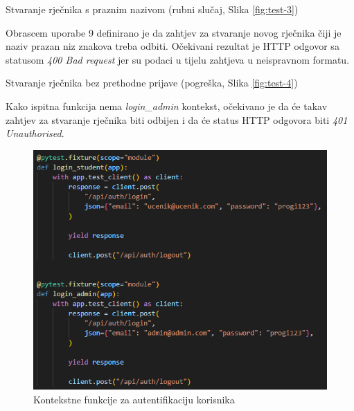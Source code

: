 \begin{packed_item}

    \item Stvaranje rječnika s praznim nazivom (rubni slučaj, Slika \ref{fig:test-3})
    \item[]  \begin{packed_item}

        \item Obrascem uporabe 9 definirano je da zahtjev za stvaranje novog rječnika čiji je naziv prazan niz znakova treba odbiti. Očekivani rezultat je HTTP odgovor sa statusom \emph{400 Bad request} jer su podaci u tijelu zahtjeva u neispravnom formatu.
        
    \end{packed_item}

    \item Stvaranje rječnika bez prethodne prijave (pogreška, Slika \ref{fig:test-4}) 
    \item[]  \begin{packed_item}

        \item Kako ispitna funkcija nema \emph{login\_admin} kontekst, očekivano je da će takav zahtjev za stvaranje rječnika biti odbijen i da će status HTTP odgovora biti \emph{401 Unauthorised}.
        
    \end{packed_item}
    
\end{packed_item}

\clearpage

\begin{figure}[htp]
	\includegraphics[scale=0.9]{slike/fixture_login.png}
	\centering
	\caption{Kontekstne funkcije za autentifikaciju korisnika}
	\label{fig:test-1}
\end{figure}

